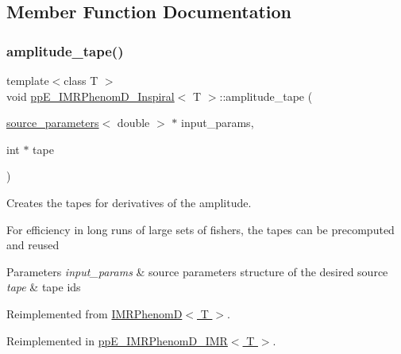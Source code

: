 \subsection{Member Function Documentation}
\mbox{\label{classppE__IMRPhenomD__Inspiral_a87474cac9d6086d5625f79e28970b5ed}} 
\subsubsection{\texorpdfstring{amplitude\+\_\+tape()}{amplitude\_tape()}}
{\footnotesize\ttfamily template$<$class T $>$ \\
void \hyperlink{classppE__IMRPhenomD__Inspiral}{pp\+E\+\_\+\+I\+M\+R\+Phenom\+D\+\_\+\+Inspiral}$<$ T $>$\+::amplitude\+\_\+tape (\begin{DoxyParamCaption}\item[{\hyperlink{structsource__parameters}{source\+\_\+parameters}$<$ double $>$ $\ast$}]{input\+\_\+params,  }\item[{int $\ast$}]{tape }\end{DoxyParamCaption})\hspace{0.3cm}{\ttfamily [virtual]}}



Creates the tapes for derivatives of the amplitude. 

For efficiency in long runs of large sets of fishers, the tapes can be precomputed and reused 
\begin{DoxyParams}{Parameters}
{\em input\+\_\+params} & source parameters structure of the desired source \\
\hline
{\em tape} & tape ids \\
\hline
\end{DoxyParams}


Reimplemented from \hyperlink{classIMRPhenomD_a6fbe3c51ee3eb66d332dc87a9fdf5bd4}{I\+M\+R\+Phenom\+D$<$ T $>$}.



Reimplemented in \hyperlink{classppE__IMRPhenomD__IMR_a3119a07c11ed53ae94823b11c5234c4f}{pp\+E\+\_\+\+I\+M\+R\+Phenom\+D\+\_\+\+I\+M\+R$<$ T $>$}.

\mbox{\label{classppE__IMRPhenomD__Inspiral_a97d35197595f31d6cfbf6a8cf7c9a9ad}} 
